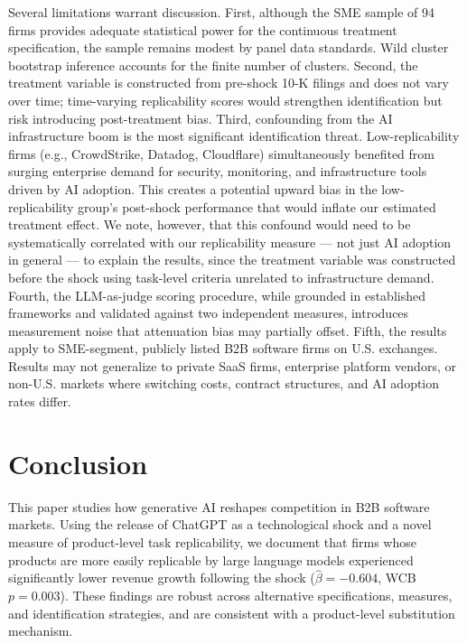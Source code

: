 \documentclass[12pt,a4paper]{article}
\begin{document}
Several limitations warrant discussion. First, although the SME sample of 94 firms provides adequate statistical power for the continuous treatment specification, the sample remains modest by panel data standards. Wild cluster bootstrap inference accounts for the finite number of clusters. Second, the treatment variable is constructed from pre-shock 10-K filings and does not vary over time; time-varying replicability scores would strengthen identification but risk introducing post-treatment bias. Third, confounding from the AI infrastructure boom is the most significant identification threat. Low-replicability firms (e.g., CrowdStrike, Datadog, Cloudflare) simultaneously benefited from surging enterprise demand for security, monitoring, and infrastructure tools driven by AI adoption. This creates a potential upward bias in the low-replicability group's post-shock performance that would inflate our estimated treatment effect. We note, however, that this confound would need to be systematically correlated with our replicability measure --- not just AI adoption in general --- to explain the results, since the treatment variable was constructed before the shock using task-level criteria unrelated to infrastructure demand. Fourth, the LLM-as-judge scoring procedure, while grounded in established frameworks and validated against two independent measures, introduces measurement noise that attenuation bias may partially offset. Fifth, the results apply to SME-segment, publicly listed B2B software firms on U.S. exchanges. Results may not generalize to private SaaS firms, enterprise platform vendors, or non-U.S. markets where switching costs, contract structures, and AI adoption rates differ.

\section{Conclusion}
\label{sec:conclusion}

This paper studies how generative AI reshapes competition in B2B software markets. Using the release of ChatGPT as a technological shock and a novel measure of product-level task replicability, we document that firms whose products are more easily replicable by large language models experienced significantly lower revenue growth following the shock ($\hat{\beta} = -0.604$, WCB $p = 0.003$). These findings are robust across alternative specifications, measures, and identification strategies, and are consistent with a product-level substitution mechanism.
\end{document}

